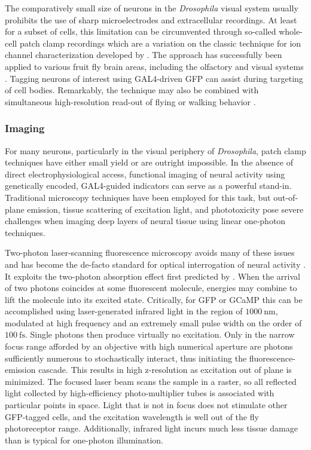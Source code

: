 
The comparatively small size of neurons in the \textit{Drosophila} visual system usually prohibits the use of sharp microelectrodes and extracellular recordings. At least for a subset of cells, this limitation can be circumvented through so-called whole-cell patch clamp recordings which are a variation on the classic technique for ion channel characterization developed by \citet{Sakmann:1984aa}. The approach has successfully been applied to various fruit fly brain areas, including the olfactory \citep{Wilson:2004aa,Murthy:2008aa} and visual systems \citep{Joesch:2008fo,Behnia:2014jh}. Tagging neurons of interest using GAL4-driven GFP can assist during targeting of cell bodies. Remarkably, the technique may also be combined with simultaneous high-resolution read-out of flying or walking behavior \citep{Maimon:2010jy,Chiappe:2010cl}.

\subsubsection{Imaging}
For many neurons, particularly in the visual periphery of \textit{Drosophila}, patch clamp techniques have either small yield or are outright impossible. In the absence of direct electrophysiological access, functional imaging of neural activity using genetically encoded, GAL4-guided indicators can serve as a powerful stand-in. Traditional microscopy techniques have been employed for this task, but out-of-plane emission, tissue scattering of excitation light, and phototoxicity pose severe challenges when imaging deep layers of neural tissue using linear one-photon techniques.

Two-photon laser-scanning fluorescence microscopy avoids many of these issues and has become the de-facto standard for optical interrogation of neural activity \citep{Denk:1990aa,Helmchen:2005aa}. It exploits the two-photon absorption effect first predicted by \citet{Goppert:1931aa}. When the arrival of two photons coincides at some fluorescent molecule, energies may combine to lift the molecule into its excited state. Critically, for GFP or GCaMP this can be accomplished using laser-generated infrared light in the region of $\SI{1000}{\nano\meter}$, modulated at high frequency and an extremely small pulse width on the order of $\SI{100}{\femto\second}$. Single photons then produce virtually no excitation. Only in the narrow focus range afforded by an objective with high numerical aperture are photons sufficiently numerous to stochastically interact, thus initiating the fluorescence-emission cascade. This results in high z-resolution as excitation out of plane is minimized. The focused laser beam scans the sample in a raster, so all reflected light collected by high-efficiency photo-multiplier tubes is associated with particular points in space. Light that is not in focus does not stimulate other GFP-tagged cells, and the excitation wavelength is well out of the fly photoreceptor range. Additionally, infrared light incurs much less tissue damage than is typical for one-photon illumination.


